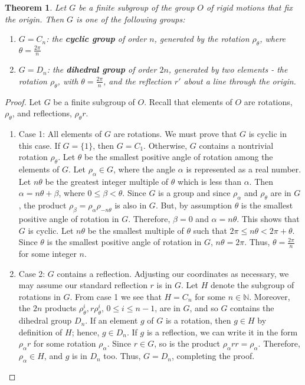 \documentclass[12pt]{article}
\newtheorem{thm}{Theorem}[section]
\theoremstyle{definition}
\theoremstyle{remark}
\numberwithin{equation}{section}
\newcommand\N{\mathbb N}    %
\newcommand\B[1]{\textbf{ #1}}
\begin{document}
\begin{thm}
        Let $G$ be a finite subgroup of the group $O$ of rigid motions that fix the origin. Then $G$ is one of the following groups: \begin{enumerate}
                \item $G = C_n$: the \B{cyclic group} of order $n$, generated by the rotation $\rho_{\theta}$, where $\theta = \frac{2\pi}{n}$
                \item $G = D_n$: the \B{dihedral group} of order $2n$, generated by two elements - the rotation $\rho_{\theta}$, with $\theta = \frac{2\pi}{n}$, and the reflection $r'$ about a line through the origin.
        \end{enumerate}
\end{thm}

\begin{proof}
        Let $G$ be a finite subgroup of $O$. Recall that elements of $O$ are rotations, $\rho_{\theta}$, and reflections, $\rho_{\theta}r$. \begin{enumerate}
                \item[] Case 1: All elements of $G$ are rotations. We must prove that $G$ is cyclic in this case. If $G = \{1\}$, then $G = C_1$. Otherwise, $G$ contains a nontrivial rotation $\rho_{\theta}$. Let $\theta$ be the smallest positive angle of rotation among the elements of $G$. Let $\rho_{\alpha} \in G$, where the angle $\alpha$ is represented as a real number. Let $n\theta$ be the greatest integer multiple of $\theta$ which is less than $\alpha$. Then $\alpha = n\theta + \beta$, where $0 \leq \beta < \theta$. Since $G$ is a group and since $\rho_{\alpha}$ and $\rho_{\theta}$ are in $G$, the product $\rho_{\beta} = \rho_{\alpha}\rho_{-n\theta}$ is also in $G$. But, by assumption $\theta$ is the smallest positive angle of rotation in $G$. Therefore, $\beta = 0$ and $\alpha = n\theta$. This shows that $G$ is cyclic. Let $n\theta$ be the smallest multiple of $\theta$ such that $2\pi \leq n\theta < 2\pi + \theta$. Since $\theta$ is the smallest positive angle of rotation in $G$, $n\theta = 2\pi$. Thus, $\theta = \frac{2\pi}{n}$ for some integer $n$.
                \item[] Case 2: $G$ contains a reflection. Adjusting our coordinates as necessary, we may assume our standard reflection $r$ is in $G$. Let $H$ denote the subgroup of rotations in $G$. From case 1 we see that $H = C_n$ for some $n \in \N$. Moreover, the $2n$ products $\rho_{\theta}^i,r\rho_{\theta}^i$, $0\leq i \leq n-1$, are in $G$, and so $G$ contains the dihedral group $D_n$. If an element $g$ of $G$ is a rotation, then $g \in H$ by definition of $H$; hence, $g \in D_n$. If $g$ is a reflection, we can write it in the form $\rho_{\alpha}r$ for some rotation $\rho_{\alpha}$. Since $r \in G$, so is the product $\rho_{\alpha}rr = \rho_{\alpha}$. Therefore, $\rho_{\alpha} \in H$, and $g$ is in $D_n$ too. Thus, $G = D_n$, completing the proof.
        \end{enumerate}
\end{proof}
\end{document}
